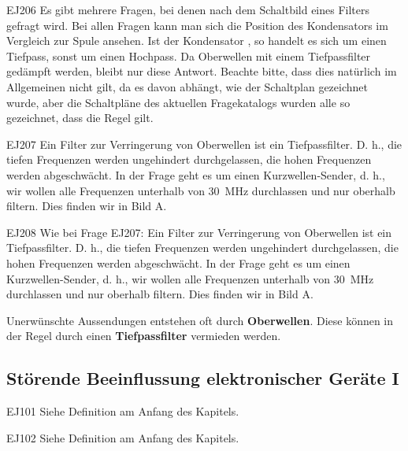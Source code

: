 \begin{sol}{EJ206}
Es gibt mehrere Fragen, bei denen nach dem Schaltbild eines Filters gefragt wird. Bei allen Fragen kann man sich die Position des Kondensators im Vergleich zur Spule ansehen. Ist der Kondensator , so handelt es sich um einen Tiefpass, sonst um einen Hochpass.
Da Oberwellen mit einem Tiefpassfilter gedämpft werden, bleibt nur diese Antwort. Beachte bitte, dass dies natürlich im Allgemeinen nicht gilt, da es davon abhängt, wie der Schaltplan gezeichnet wurde, aber die Schaltpläne des aktuellen Fragekatalogs wurden alle so gezeichnet, dass die Regel gilt. 
\end{sol}


\begin{sol}{EJ207}
Ein Filter zur Verringerung von Oberwellen ist ein Tiefpassfilter. D. h., die tiefen Frequenzen werden ungehindert durchgelassen, die hohen Frequenzen werden abgeschwächt.
In der Frage geht es um einen Kurzwellen-Sender, d. h., wir wollen alle Frequenzen unterhalb von \SI{30}{\mega\hertz} durchlassen und nur oberhalb filtern. Dies finden wir in Bild A.
\end{sol}   


\begin{sol}{EJ208}
Wie bei Frage EJ207: Ein Filter zur Verringerung von Oberwellen ist ein Tiefpassfilter. D. h., die tiefen Frequenzen werden ungehindert durchgelassen, die hohen Frequenzen werden abgeschwächt.
In der Frage geht es um einen Kurzwellen-Sender, d. h., wir wollen alle Frequenzen unterhalb von \SI{30}{\mega\hertz} durchlassen und nur oberhalb filtern. Dies finden wir in Bild A.
\end{sol}  

\begin{ohmchapter}
  Unerwünschte Aussendungen entstehen oft durch \textbf{Oberwellen}. Diese können in der Regel durch einen \textbf{Tiefpassfilter} vermieden werden.
\end{ohmchapter}


\subsection{Störende Beeinflussung elektronischer Geräte I}


\begin{sol}{EJ101}
Siehe Definition am Anfang des Kapitels.
\end{sol}  

\begin{sol}{EJ102}
Siehe Definition am Anfang des Kapitels.
\end{sol}  


